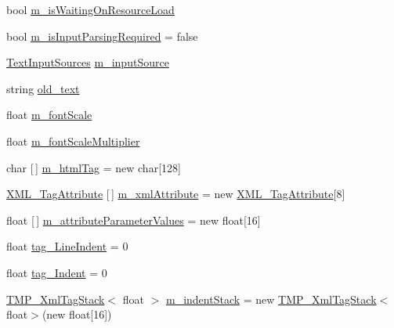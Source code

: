 \begin{DoxyCompactItemize}
\item 
bool \mbox{\hyperlink{class_t_m_pro_1_1_t_m_p___text_acc6ace46f5536ae001e5f75aef03a427}{m\+\_\+is\+Waiting\+On\+Resource\+Load}}
\item 
bool \mbox{\hyperlink{class_t_m_pro_1_1_t_m_p___text_acf1886e1ecb1cc39316fc9f25ebbdfd6}{m\+\_\+is\+Input\+Parsing\+Required}} = false
\item 
\mbox{\hyperlink{class_t_m_pro_1_1_t_m_p___text_ad5e8f5f99ee7ce332ad3531b8ba0096d}{Text\+Input\+Sources}} \mbox{\hyperlink{class_t_m_pro_1_1_t_m_p___text_afb489cf0fbdef30ad456edfd5be8c71e}{m\+\_\+input\+Source}}
\item 
string \mbox{\hyperlink{class_t_m_pro_1_1_t_m_p___text_aa48e87f2f645db932c63be96aa447fdd}{old\+\_\+text}}
\item 
float \mbox{\hyperlink{class_t_m_pro_1_1_t_m_p___text_ac18fcb9bac4b41193de358c6bf535415}{m\+\_\+font\+Scale}}
\item 
float \mbox{\hyperlink{class_t_m_pro_1_1_t_m_p___text_af4ddb16d2ac394049227071b79687c71}{m\+\_\+font\+Scale\+Multiplier}}
\item 
char \mbox{[}$\,$\mbox{]} \mbox{\hyperlink{class_t_m_pro_1_1_t_m_p___text_a150ea1996bea126c6976729e270cfc29}{m\+\_\+html\+Tag}} = new char\mbox{[}128\mbox{]}
\item 
\mbox{\hyperlink{struct_t_m_pro_1_1_x_m_l___tag_attribute}{X\+M\+L\+\_\+\+Tag\+Attribute}} \mbox{[}$\,$\mbox{]} \mbox{\hyperlink{class_t_m_pro_1_1_t_m_p___text_a88af71f2ccece16a24c10bb5d1b1da83}{m\+\_\+xml\+Attribute}} = new \mbox{\hyperlink{struct_t_m_pro_1_1_x_m_l___tag_attribute}{X\+M\+L\+\_\+\+Tag\+Attribute}}\mbox{[}8\mbox{]}
\item 
float \mbox{[}$\,$\mbox{]} \mbox{\hyperlink{class_t_m_pro_1_1_t_m_p___text_add33c24f6ebc87adc90e3adc61db4c42}{m\+\_\+attribute\+Parameter\+Values}} = new float\mbox{[}16\mbox{]}
\item 
float \mbox{\hyperlink{class_t_m_pro_1_1_t_m_p___text_a55b9b34c0e363e6f318c897ac4c4202f}{tag\+\_\+\+Line\+Indent}} = 0
\item 
float \mbox{\hyperlink{class_t_m_pro_1_1_t_m_p___text_ae0b03485afd22e86ed63bb43509ecf24}{tag\+\_\+\+Indent}} = 0
\item 
\mbox{\hyperlink{struct_t_m_pro_1_1_t_m_p___xml_tag_stack}{T\+M\+P\+\_\+\+Xml\+Tag\+Stack}}$<$ float $>$ \mbox{\hyperlink{class_t_m_pro_1_1_t_m_p___text_a95340e7f060b7ae93364e4343d5045ca}{m\+\_\+indent\+Stack}} = new \mbox{\hyperlink{struct_t_m_pro_1_1_t_m_p___xml_tag_stack}{T\+M\+P\+\_\+\+Xml\+Tag\+Stack}}$<$float$>$(new float\mbox{[}16\mbox{]})

\end{DoxyCompactItemize}
